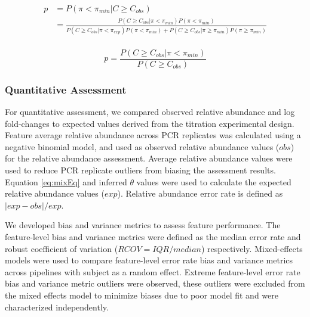 \documentclass{bmcart}
\begin{document}
\begin{equation}
  \begin{split}
    p & = P(\pi < \pi_{min} | C \geq C_{obs}) \\
      & = \frac{P(C \geq C_{obs}| \pi < \pi_{min})P(\pi < \pi_{min})}{P(C \geq C_{obs}| \pi < \pi_{exp})P(\pi < \pi_{min}) + P(C \geq C_{obs}| \pi \geq \pi_{min})P(\pi \geq \pi_{min})} \\
  \end{split}
  \label{eq:bht}
\end{equation}

\begin{equation}
    p = \frac{P(C \geq C_{obs}| \pi < \pi_{min})}{P(C \geq C_{obs})}
  \label{eq:bht2}
\end{equation}

\subsubsection*{Quantitative Assessment}

For quantitative assessment, we compared observed relative abundance and
log fold-changes to expected values derived from the titration
experimental design.\\
Feature average relative abundance across PCR replicates was calculated
using a negative binomial model, and used as observed relative abundance
values (\(obs\)) for the relative abundance assessment. Average relative
abundance values were used to reduce PCR replicate outliers from biasing
the assessment results. Equation \eqref{eq:mixEq} and inferred \(\theta\)
values were used to calculate the expected relative abundance values
(\(exp\)). Relative abundance error rate is defined as
\(|exp - obs|/exp\).

We developed bias and variance metrics to assess feature performance.
The feature-level bias and variance metrics were defined as the median
error rate and robust coefficient of variation (\(RCOV=IQR/median\))
respectively. Mixed-effects models were used to compare feature-level
error rate bias and variance metrics across pipelines with subject as a
random effect. Extreme feature-level error rate bias and variance metric
outliers were observed, these outliers were excluded from the mixed
effects model to minimize biases due to poor model fit and were
characterized independently.
\end{document}
